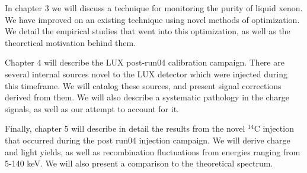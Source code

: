 In chapter 3 we will discuss a technique for monitoring the purity of liquid xenon. We have improved on an existing technique using novel methods of optimization. We detail the empirical studies that went into this optimization, as well as the theoretical motivation behind them.

Chapter 4 will describe the LUX post-run04 calibration campaign. There are several internal sources novel to the LUX detector which were injected during this timeframe. We will catalog these sources, and present signal corrections derived from them. We will also describe a systematic pathology in the charge signals, as well as our attempt to account for it. 

Finally, chapter 5 will describe in detail the results from the novel $^{14}$C injection that occurred during the post run04 injection campaign. We will derive charge and light yields, as well as recombination fluctuations from energies ranging from 5-140 keV. We will also present a comparison to the theoretical spectrum.


